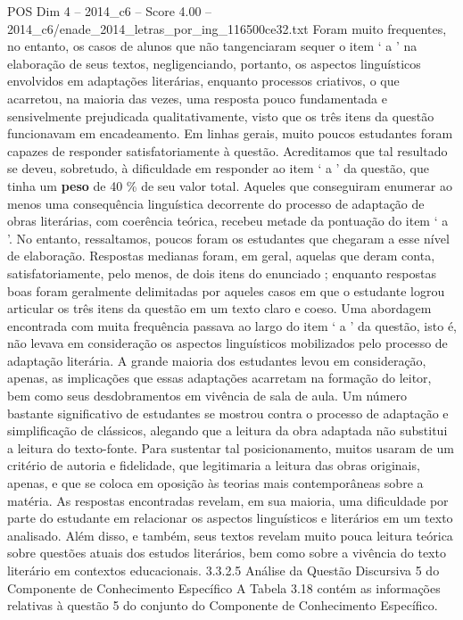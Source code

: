 \begin{textsample}{POS Dim 4 – 2014\_c6 – Score 4.00 – 2014\_c6/enade\_2014\_letras\_por\_ing\_116500ce32.txt}
Foram muito frequentes, no entanto, os casos de alunos que não tangenciaram sequer o item ‘ a ’ na elaboração de seus textos, negligenciando, portanto, os aspectos linguísticos envolvidos em adaptações literárias, enquanto processos criativos, o que acarretou, na maioria das vezes, uma resposta pouco fundamentada e sensivelmente prejudicada qualitativamente, visto que os três itens da questão funcionavam em encadeamento.
Em linhas gerais, muito poucos estudantes foram capazes de responder satisfatoriamente à questão.
Acreditamos que tal resultado se deveu, sobretudo, à dificuldade em responder ao item ‘ a ’ da questão, que tinha um \textbf{peso} de 40 \% de seu valor total.
Aqueles que conseguiram enumerar ao menos uma consequência linguística decorrente do processo de adaptação de obras literárias, com coerência teórica, recebeu metade da pontuação do item ‘ a ’.
No entanto, ressaltamos, poucos foram os estudantes que chegaram a esse nível de elaboração.
Respostas medianas foram, em geral, aquelas que deram conta, satisfatoriamente, pelo menos, de dois itens do enunciado ; enquanto respostas boas foram geralmente delimitadas por aqueles casos em que o estudante logrou articular os três itens da questão em um texto claro e coeso.
Uma abordagem encontrada com muita frequência passava ao largo do item ‘ a ’ da questão, isto é, não levava em consideração os aspectos linguísticos mobilizados pelo processo de adaptação literária.
A grande maioria dos estudantes levou em consideração, apenas, as implicações que essas adaptações acarretam na formação do leitor, bem como seus desdobramentos em vivência de sala de aula.
Um número bastante significativo de estudantes se mostrou contra o processo de adaptação e simplificação de clássicos, alegando que a leitura da obra adaptada não substitui a leitura do texto-fonte.
Para sustentar tal posicionamento, muitos usaram de um critério de autoria e fidelidade, que legitimaria a leitura das obras originais, apenas, e que se coloca em oposição às teorias mais contemporâneas sobre a matéria.
As respostas encontradas revelam, em sua maioria, uma dificuldade por parte do estudante em relacionar os aspectos linguísticos e literários em um texto analisado.
Além disso, e também, seus textos revelam muito pouca leitura teórica sobre questões atuais dos estudos literários, bem como sobre a vivência do texto literário em contextos educacionais. 3.3.2.5 Análise da Questão Discursiva 5 do Componente de Conhecimento Específico A Tabela 3.18 contém as informações relativas à questão 5 do conjunto do Componente de Conhecimento Específico.

\end{textsample}
